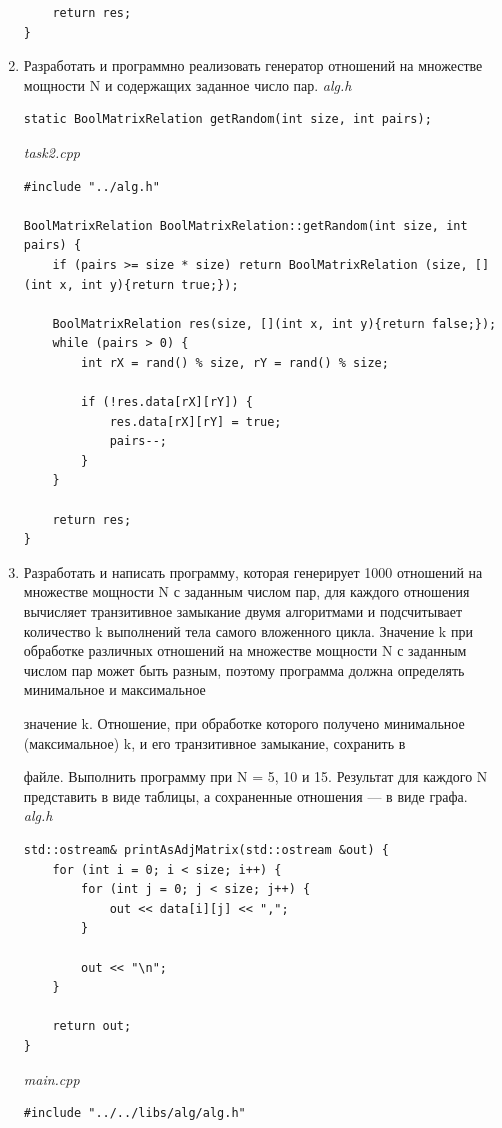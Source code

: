 \documentclass[a4paper,14pt]{extarticle}
\begin{document}
\begin{enumerate}[1.]
\begin{verbatim}
    return res;
}
	\end{verbatim}
	\item Разработать и программно реализовать генератор отношений на
	      множестве мощности N и содержащих заданное число пар.
	      \textit{alg.h}
	      \begin{verbatim}
static BoolMatrixRelation getRandom(int size, int pairs);
	\end{verbatim}
	      \textit{task2.cpp}
	      \begin{verbatim}
#include "../alg.h"

BoolMatrixRelation BoolMatrixRelation::getRandom(int size, int pairs) {
    if (pairs >= size * size) return BoolMatrixRelation (size, [](int x, int y){return true;});
    
    BoolMatrixRelation res(size, [](int x, int y){return false;});
    while (pairs > 0) {
        int rX = rand() % size, rY = rand() % size;

        if (!res.data[rX][rY]) {
            res.data[rX][rY] = true;
            pairs--;
        }
    }

    return res;
}
	\end{verbatim}
	\item Разработать и написать программу, которая генерирует
	      1000 отношений на множестве мощности N с заданным числом пар,
	      для каждого отношения вычисляет транзитивное замыкание двумя
	      алгоритмами и подсчитывает количество k выполнений тела самого
	      вложенного цикла. Значение k при обработке различных отношений на
	      множестве мощности N с заданным числом пар может быть разным,
	      поэтому программа должна определять минимальное и максимальное

	      значение k. Отношение, при обработке которого получено минимальное
	      (максимальное) k, и его транзитивное замыкание, сохранить в

	      файле. Выполнить программу при N = 5, 10 и 15. Результат для каждого
	      N представить в виде таблицы, а сохраненные отношения — в виде графа.\\
	      \textit{alg.h}
	      \begin{verbatim}
std::ostream& printAsAdjMatrix(std::ostream &out) {
    for (int i = 0; i < size; i++) {
        for (int j = 0; j < size; j++) {
            out << data[i][j] << ",";
        }

        out << "\n";
    }

    return out;
}
\end{verbatim}
	      \textit{main.cpp}
	      \begin{verbatim}
#include "../../libs/alg/alg.h"


\end{verbatim}
\end{enumerate}
\end{document}
